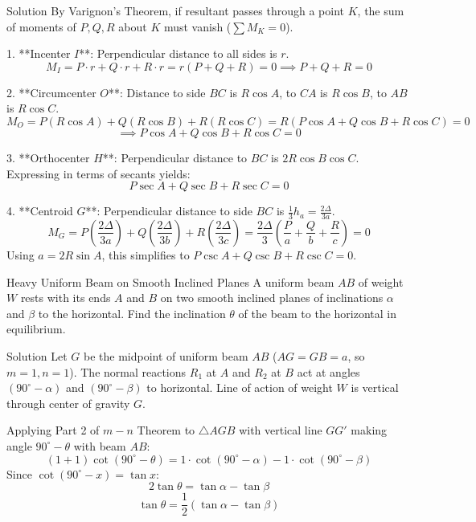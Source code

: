 \documentclass[11pt,a4paper]{article}
\begin{document}
\begin{proofbox}{Solution}
By Varignon's Theorem, if resultant passes through a point $K$, the sum of moments of $P, Q, R$ about $K$ must vanish ($\sum M_K = 0$).

1. **Incenter $I$**: Perpendicular distance to all sides is $r$.
   \[ M_I = P \cdot r + Q \cdot r + R \cdot r = r(P+Q+R) = 0 \implies P+Q+R=0 \]

2. **Circumcenter $O$**: Distance to side $BC$ is $R\cos A$, to $CA$ is $R\cos B$, to $AB$ is $R\cos C$.
   \[ M_O = P(R\cos A) + Q(R\cos B) + R(R\cos C) = R(P\cos A + Q\cos B + R\cos C) = 0 \]
   \[ \implies P\cos A + Q\cos B + R\cos C = 0 \]

3. **Orthocenter $H$**: Perpendicular distance to $BC$ is $2R\cos B \cos C$. Expressing in terms of secants yields:
   \[ P\sec A + Q\sec B + R\sec C = 0 \]

4. **Centroid $G$**: Perpendicular distance to side $BC$ is $\frac{1}{3} h_a = \frac{2\Delta}{3a}$.
   \[ M_G = P\left(\frac{2\Delta}{3a}\right) + Q\left(\frac{2\Delta}{3b}\right) + R\left(\frac{2\Delta}{3c}\right) = \frac{2\Delta}{3}\left(\frac{P}{a} + \frac{Q}{b} + \frac{R}{c}\right) = 0 \]
   Using $a = 2R\sin A$, this simplifies to $P\csc A + Q\csc B + R\csc C = 0$.
\end{proofbox}

\begin{examplebox}{Heavy Uniform Beam on Smooth Inclined Planes}
A uniform beam $AB$ of weight $W$ rests with its ends $A$ and $B$ on two smooth inclined planes of inclinations $\alpha$ and $\beta$ to the horizontal. Find the inclination $\theta$ of the beam to the horizontal in equilibrium.
\end{examplebox}

\begin{proofbox}{Solution}
Let $G$ be the midpoint of uniform beam $AB$ ($AG = GB = a$, so $m=1, n=1$).
The normal reactions $R_1$ at $A$ and $R_2$ at $B$ act at angles $(90^\circ - \alpha)$ and $(90^\circ - \beta)$ to horizontal.
Line of action of weight $W$ is vertical through center of gravity $G$.

Applying Part 2 of $m-n$ Theorem to $\triangle AGB$ with vertical line $GG'$ making angle $90^\circ - \theta$ with beam $AB$:
\[
(1 + 1) \cot(90^\circ - \theta) = 1 \cdot \cot(90^\circ - \alpha) - 1 \cdot \cot(90^\circ - \beta)
\]
Since $\cot(90^\circ - x) = \tan x$:
\[
2 \tan\theta = \tan\alpha - \tan\beta
\]
\begin{equation}
\tan\theta = \frac{1}{2} (\tan\alpha - \tan\beta)
\end{equation}
\end{proofbox}
\end{document}
